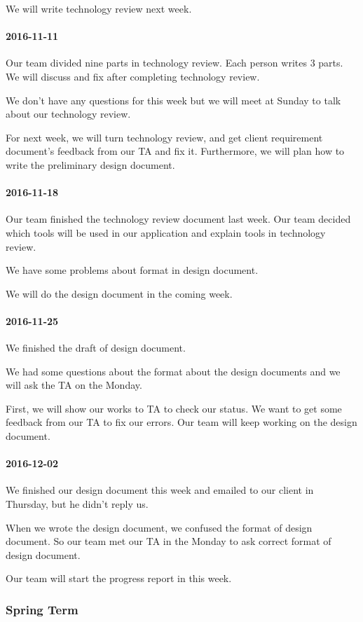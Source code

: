 We will write technology review next week.
\paragraph{2016-11-11}
Our team divided nine parts in technology review. Each person writes 3 parts. We will discuss and fix after completing technology review.

We don't have any questions for this week but we will meet at Sunday to talk about our technology review.

For next week, we will turn technology review, and get client requirement document's feedback from our TA and fix it. Furthermore, we will plan how to write the preliminary design document.
\paragraph{2016-11-18}
Our team finished the technology review document last week. Our team decided which tools will be used in our application and explain tools in technology review.

We have some problems about format in design document.

We will do the design document in the coming week.
\paragraph{2016-11-25}
We finished the draft of design document.

We had some questions about the format about the design documents and we will ask the TA on the Monday.

First, we will show our works to TA to check our status. We want to get some feedback from our TA to fix our errors. Our team will keep working on the design document.
\paragraph{2016-12-02}
We finished our design document this week and emailed to our client in Thursday, but he didn't reply us.

When we wrote the design document, we confused the format of design document. So our team met our TA in the Monday to ask correct format of design document.

Our team will start the progress report in this week.
\subsubsection{Spring Term}

